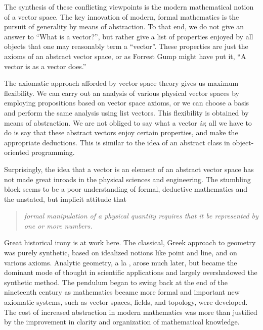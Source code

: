 \documentclass[12pt]{article}
\begin{document}
The synthesis of these conflicting viewpoints is the modern
mathematical notion of a vector space.  The key innovation of modern,
formal mathematics is the pursuit of generality by means of
abstraction.  To that end, we do not give an answer to ``What is a
vector?'', but rather give a list of properties enjoyed by all objects
that one may reasonably term a ``vector''.  These properties are just
the axioms of an abstract vector space, or as Forrest Gump\cite{gump}
might have put it, ``A vector is as a vector does.''  

The axiomatic approach afforded by vector space theory gives us
maximum flexibility.  We can carry out an analysis of various physical
vector spaces by employing propositions based on vector space axioms,
or we can choose a basis and perform the same analysis using list
vectors.  This flexibility is obtained by means of abstraction.  We
are not obliged to say what a vector {\em is}; all we have to do is
say that these abstract vectors enjoy certain properties, and make the
appropriate deductions.  This is similar to the idea of an abstract
class in object-oriented programming.


Surprisingly, the idea that a vector is an element of an abstract
vector space has not made great inroads in the physical sciences and
engineering.  The stumbling block seems to be a poor understanding of
formal, deductive mathematics and the unstated, but implicit attitude
that
\begin{quote}
  \em formal manipulation of a physical quantity requires that it be
  represented by one or more numbers.
\end{quote}
Great historical irony is at work here.  The classical, Greek approach
to geometry was purely synthetic, based on idealized notions like
point and line, and on various axioms.  Analytic geometry, a la
,
arose much later, but became the dominant mode of thought in
scientific applications and largely overshadowed the synthetic method.
The pendulum began to swing back at the end of the nineteenth century
as mathematics became more formal and important new axiomatic systems,
such as vector spaces, fields, and topology, were developed.  The cost
of increased abstraction in modern mathematics was more than justified
by the improvement in clarity and organization of mathematical
knowledge.
\end{document}
